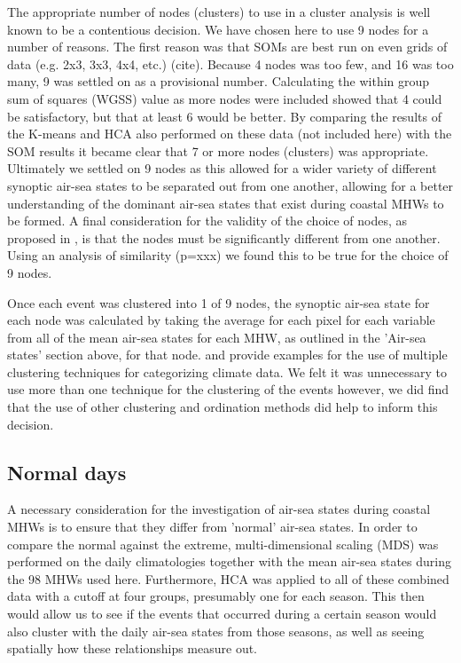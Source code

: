 \documentclass[a4paper,10pt,review]{elsarticle}
\begin{document}
The appropriate number of nodes (clusters) to use in a cluster analysis is well known to be a contentious decision. We have chosen here to use 9 nodes for a number of reasons. The first reason was that SOMs are best run on even grids of data (e.g. 2x3, 3x3, 4x4, etc.) (cite). Because 4 nodes was too few, and 16 was too many, 9 was settled on as a provisional number. Calculating the within group sum of squares (WGSS) value as more nodes were included showed that 4 could be satisfactory, but that at least 6 would be better. By comparing the results of the K-means and HCA also performed on these data (not included here) with the SOM results it became clear that 7 or more nodes (clusters) was appropriate. Ultimately we settled on 9 nodes as this allowed for a wider variety of different synoptic air-sea states to be separated out from one another, allowing for a better understanding of the dominant air-sea states that exist during coastal MHWs to be formed. A final consideration for the validity of the choice of nodes, as proposed in \citet{Johnson2013}, is that the nodes must be significantly different from one another. Using an analysis of similarity (p=xxx) we found this to be true for the choice of 9 nodes.

Once each event was clustered into 1 of 9 nodes, the synoptic air-sea state for each node was calculated by taking the average for each pixel for each variable from all of the mean air-sea states for each MHW, as outlined in the 'Air-sea states' section above, for that node. \citet{Ambroise2000} and \citet{Ramos2001} provide examples for the use of multiple clustering techniques for categorizing climate data. We felt it was unnecessary to use more than one technique for the clustering of the events however, we did find that the use of other clustering and ordination methods did help to inform this decision.

\subsection{Normal days}
A necessary consideration for the investigation of air-sea states during coastal MHWs is to ensure that they differ from 'normal' air-sea states. In order to compare the normal against the extreme, multi-dimensional scaling (MDS) was performed on the daily climatologies together with the mean air-sea states during the 98 MHWs used here. Furthermore, HCA was applied to all of these combined data with a cutoff at four groups, presumably one for each season. This then would allow us to see if the events that occurred during a certain season would also cluster with the daily air-sea states from those seasons, as well as seeing spatially how these relationships measure out.
\end{document}
